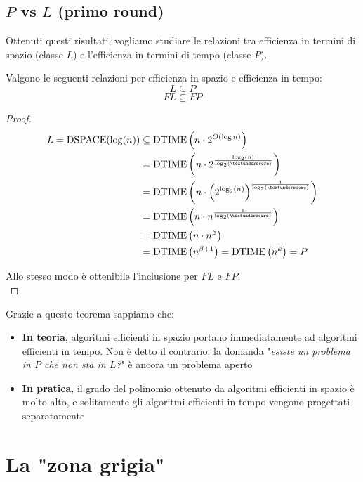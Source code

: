 \subsection{$P$ vs $L$ (primo round)}

Ottenuti questi risultati, vogliamo studiare le relazioni tra efficienza in termini di spazio (classe $L$) e l'efficienza in termini di tempo (classe $P$).\\

\begin{theor}
	Valgono le seguenti relazioni per efficienza in spazio e efficienza in tempo:
	$$ L \subseteq P $$
	$$ FL \subseteq FP $$
\end{theor}
\begin{proof}
	\begin{align*}
		L = \dspace (\log (n)) & \subseteq \dtime \left(n \cdot 2^{O(\log n)}\right) \\
		& = \dtime \left(n \cdot 2^{\frac{\log_2 (n)}{\log_2 (\textunderscore)}}\right) \\
		& = \dtime \left(n \cdot \left(2^{\log_2 (n)}\right)^{\frac{1}{\log_2 (\textunderscore)}}\right) \\
		& = \dtime \left(n \cdot n^{\frac{1}{\log_2 (\textunderscore)}}\right) \\
		& = \dtime \left(n \cdot n^\beta \right) \\
		& = \dtime \left(n^{\beta + 1}\right) = \dtime\left(n^k\right) = P
	\end{align*}
	
	Allo stesso modo è ottenibile l'inclusione per $FL$ e $FP$.\\
\end{proof}

Grazie a questo teorema sappiamo che:
\begin{itemize}
	\item \textbf{In teoria}, algoritmi efficienti in spazio portano immediatamente ad algoritmi efficienti in tempo. Non è detto il contrario: la domanda "\textit{esiste un problema in $P$ che non sta in $L$?}" è ancora un problema aperto
	\item \textbf{In pratica}, il grado del polinomio ottenuto da algoritmi efficienti in spazio è molto alto, e solitamente gli algoritmi efficienti in tempo vengono progettati separatamente
\end{itemize}

\section{La "zona grigia"}

